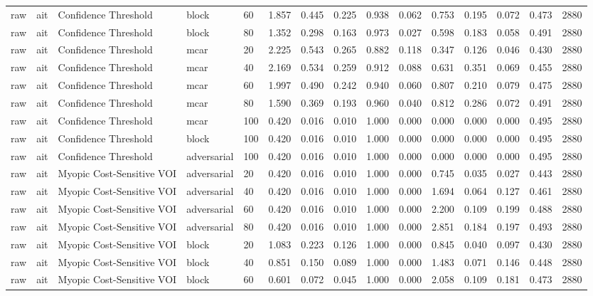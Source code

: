 \begin{table}[!ht]
{\begin{tabular}{lllllllllllllll}
raw & ait & Confidence Threshold & block & 60 & 1.857 & 0.445 & 0.225 & 0.938 & 0.062 & 0.753 & 0.195 & 0.072 & 0.473 & 2880 \\
raw & ait & Confidence Threshold & block & 80 & 1.352 & 0.298 & 0.163 & 0.973 & 0.027 & 0.598 & 0.183 & 0.058 & 0.491 & 2880 \\
raw & ait & Confidence Threshold & mcar & 20 & 2.225 & 0.543 & 0.265 & 0.882 & 0.118 & 0.347 & 0.126 & 0.046 & 0.430 & 2880 \\
raw & ait & Confidence Threshold & mcar & 40 & 2.169 & 0.534 & 0.259 & 0.912 & 0.088 & 0.631 & 0.351 & 0.069 & 0.455 & 2880 \\
raw & ait & Confidence Threshold & mcar & 60 & 1.997 & 0.490 & 0.242 & 0.940 & 0.060 & 0.807 & 0.210 & 0.079 & 0.475 & 2880 \\
raw & ait & Confidence Threshold & mcar & 80 & 1.590 & 0.369 & 0.193 & 0.960 & 0.040 & 0.812 & 0.286 & 0.072 & 0.491 & 2880 \\
raw & ait & Confidence Threshold & mcar & 100 & 0.420 & 0.016 & 0.010 & 1.000 & 0.000 & 0.000 & 0.000 & 0.000 & 0.495 & 2880 \\
raw & ait & Confidence Threshold & block & 100 & 0.420 & 0.016 & 0.010 & 1.000 & 0.000 & 0.000 & 0.000 & 0.000 & 0.495 & 2880 \\
raw & ait & Confidence Threshold & adversarial & 100 & 0.420 & 0.016 & 0.010 & 1.000 & 0.000 & 0.000 & 0.000 & 0.000 & 0.495 & 2880 \\
raw & ait & Myopic Cost-Sensitive VOI & adversarial & 20 & 0.420 & 0.016 & 0.010 & 1.000 & 0.000 & 0.745 & 0.035 & 0.027 & 0.443 & 2880 \\
raw & ait & Myopic Cost-Sensitive VOI & adversarial & 40 & 0.420 & 0.016 & 0.010 & 1.000 & 0.000 & 1.694 & 0.064 & 0.127 & 0.461 & 2880 \\
raw & ait & Myopic Cost-Sensitive VOI & adversarial & 60 & 0.420 & 0.016 & 0.010 & 1.000 & 0.000 & 2.200 & 0.109 & 0.199 & 0.488 & 2880 \\
raw & ait & Myopic Cost-Sensitive VOI & adversarial & 80 & 0.420 & 0.016 & 0.010 & 1.000 & 0.000 & 2.851 & 0.184 & 0.197 & 0.493 & 2880 \\
raw & ait & Myopic Cost-Sensitive VOI & block & 20 & 1.083 & 0.223 & 0.126 & 1.000 & 0.000 & 0.845 & 0.040 & 0.097 & 0.430 & 2880 \\
raw & ait & Myopic Cost-Sensitive VOI & block & 40 & 0.851 & 0.150 & 0.089 & 1.000 & 0.000 & 1.483 & 0.071 & 0.146 & 0.448 & 2880 \\
raw & ait & Myopic Cost-Sensitive VOI & block & 60 & 0.601 & 0.072 & 0.045 & 1.000 & 0.000 & 2.058 & 0.109 & 0.181 & 0.473 & 2880 \\

\end{tabular}}
\end{table}
